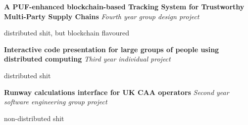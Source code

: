 
\bigskip
{}%
\textbf{A PUF-enhanced blockchain-based Tracking System for Trustworthy Multi-Party Supply Chains} \newline
\emph{Fourth year group design project} 
\begin{itemize*}
  \item distributed shit, but blockchain flavoured
\end{itemize*}

\smallskip
\textbf{Interactive code presentation for large groups of people using distributed computing} \newline
\emph{Third year individual project} 
\begin{itemize*}
  \item distributed shit
\end{itemize*}

\smallskip
\textbf{Runway calculations interface for UK CAA operators} \newline
\emph{Second year software engineering group project} 
\begin{itemize*}
  \item non-distributed shit
\end{itemize*}
